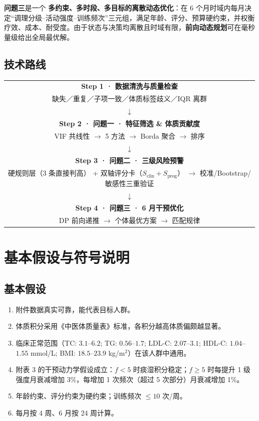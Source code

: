 \documentclass{MathorCupmodeling}
\providecommand{\tightlist}{%
  \setlength{\itemsep}{0pt}\setlength{\parskip}{0pt}}
\begin{document}
\textbf{问题三}是一个 \textbf{多约束、多时段、多目标的离散动态优化}：在 6 个月时域内每月决定``调理分级--活动强度--训练频次''三元组，满足年龄、评分、预算硬约束，并权衡疗效、成本、耐受度。由于状态与决策均离散且时域有限，\textbf{前向动态规划}可在毫秒量级给出全局最优解。

\subsection{技术路线}

\begin{center}
\begin{tabular}{|c|}
\hline
\textbf{Step 1 · 数据清洗与质量检查} \\
缺失／重复／子项一致／体质标签歧义／IQR 离群 \\
\hline
$\downarrow$ \\
\hline
\textbf{Step 2 · 问题一 · 特征筛选 \& 体质贡献度} \\
VIF 共线性 $\to$ 5 方法 $\to$ Borda 聚合 $\to$ 排序 \\
\hline
$\downarrow$ \\
\hline
\textbf{Step 3 · 问题二 · 三级风险预警} \\
硬规则层（3 条直接判高） + 双轴评分卡（$S_{\text{clin}}+S_{\text{prog}}$） $\to$ 校准/Bootstrap/敏感性三重验证 \\
\hline
$\downarrow$ \\
\hline
\textbf{Step 4 · 问题三 · 6 月干预优化} \\
DP 前向递推 $\to$ 个体最优方案 $\to$ 匹配规律 \\
\hline
\end{tabular}
\end{center}

\section{基本假设与符号说明}

\subsection{基本假设}

\begin{enumerate}
\def\labelenumi{\arabic{enumi}.}
\tightlist
\item 附件数据真实可靠，能代表目标人群。
\item 体质积分采用《中医体质量表》标准，各积分越高体质偏颇越显著。
\item 临床正常范围（TC: $3.1$--$6.2$; TG: $0.56$--$1.7$; LDL-C: $2.07$--$3.1$; HDL-C: $1.04$--$1.55$ mmol/L; BMI: $18.5$--$23.9$ kg/m$^2$）在该人群中通用。
\item 附表 3 的干预动力学假设成立：$f < 5$ 时痰湿积分稳定；$f \ge 5$ 时每提升 1 级强度月衰减增加 3\%，每增加 1 次频次（超过 5 次部分）月衰减增加 1\%。
\item 年龄约束、评分约束为硬约束；训练频次 $\le 10$ 次/周。
\item 每月按 4 周、6 月按 24 周计算。
\end{enumerate}
\end{document}
